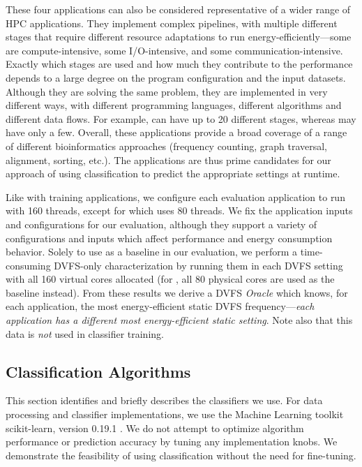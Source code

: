 These four applications can also be considered representative of a wider range of HPC applications.
They implement complex pipelines, with multiple different stages that require different resource adaptations to run energy-efficiently---some are compute-intensive, some I/O-intensive, and some communication-intensive.
Exactly which stages are used and how much they contribute to the performance depends to a large degree on the program configuration and the input datasets.
Although they are solving the same problem, they are implemented in very different ways, with different programming languages, different algorithms and different data flows.
For example,  can have up to 20 different stages, whereas  may have only a few.
Overall, these applications provide a broad coverage of a range of different bioinformatics approaches (frequency counting, graph traversal, alignment, sorting, etc.).
The applications are thus prime candidates for our approach of using classification to predict the appropriate settings at runtime.

Like with training applications, we configure each evaluation application to run with 160 threads, except for  which uses 80 threads.
We fix the application inputs and configurations for our evaluation, although they support a variety of configurations and inputs which affect performance and energy consumption behavior.
Solely to use as a baseline in our evaluation, we perform a time-consuming DVFS-only characterization by running them in each DVFS setting with all 160 virtual cores allocated (for , all 80 physical cores are used as the baseline instead).
From these results we derive a DVFS \emph{Oracle} which knows, for each application, the most energy-efficient static DVFS frequency---\emph{each application has a different most energy-efficient static setting}.
Note also that this data is \emph{not} used in classifier training.


\subsection{Classification Algorithms}

This section identifies and briefly describes the classifiers we use.
For data processing and classifier implementations, we use the Machine Learning toolkit scikit-learn, version 0.19.1 \cite{scikit-learn}.
We do not attempt to optimize algorithm performance or prediction accuracy by tuning any implementation knobs.
We demonstrate the feasibility of using classification without the need for fine-tuning.

